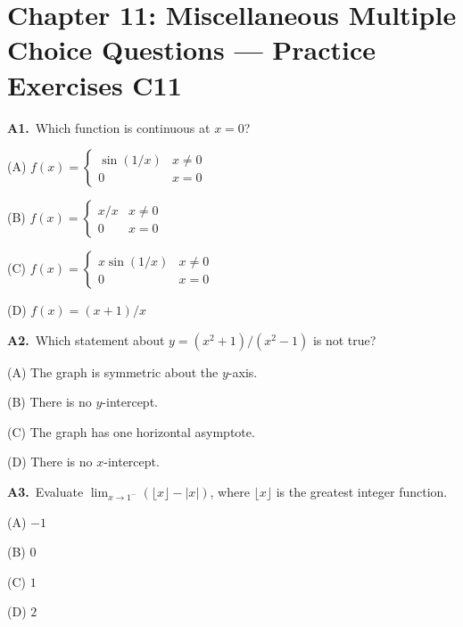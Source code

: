 \documentclass[11pt]{article}
\begin{document}
\section*{Chapter 11: Miscellaneous Multiple Choice Questions --- Practice Exercises C11}

\bigskip\noindent\textbf{A1.}\ Which function is continuous at $x=0$?
\begin{list}{}{\setlength{\leftmargin}{3em}\setlength{\labelwidth}{2.5em}\setlength{\itemsep}{0pt}\setlength{\topsep}{2pt}}
\item[(A)] $f(x)=\begin{cases}\sin(1/x)&x\ne0\\0&x=0\end{cases}$
\item[(B)] $f(x)=\begin{cases}x/x&x\ne0\\0&x=0\end{cases}$
\item[(C)] $f(x)=\begin{cases}x\sin(1/x)&x\ne0\\0&x=0\end{cases}$
\item[(D)] $f(x)=(x+1)/x$
\end{list}

\bigskip\noindent\textbf{A2.}\ Which statement about $y=(x^2+1)/(x^2-1)$ is not true?
\begin{list}{}{\setlength{\leftmargin}{3em}\setlength{\labelwidth}{2.5em}\setlength{\itemsep}{0pt}\setlength{\topsep}{2pt}}
\item[(A)] The graph is symmetric about the $y$-axis.
\item[(B)] There is no $y$-intercept.
\item[(C)] The graph has one horizontal asymptote.
\item[(D)] There is no $x$-intercept.
\end{list}

\bigskip\noindent\textbf{A3.}\ Evaluate $\lim_{x\to1^-}(\lfloor x\rfloor-|x|)$, where $\lfloor x\rfloor$ is the greatest integer function.
\begin{list}{}{\setlength{\leftmargin}{3em}\setlength{\labelwidth}{2.5em}\setlength{\itemsep}{0pt}\setlength{\topsep}{2pt}}
\item[(A)] $-1$
\item[(B)] $0$
\item[(C)] $1$
\item[(D)] $2$
\end{list}
\end{document}
